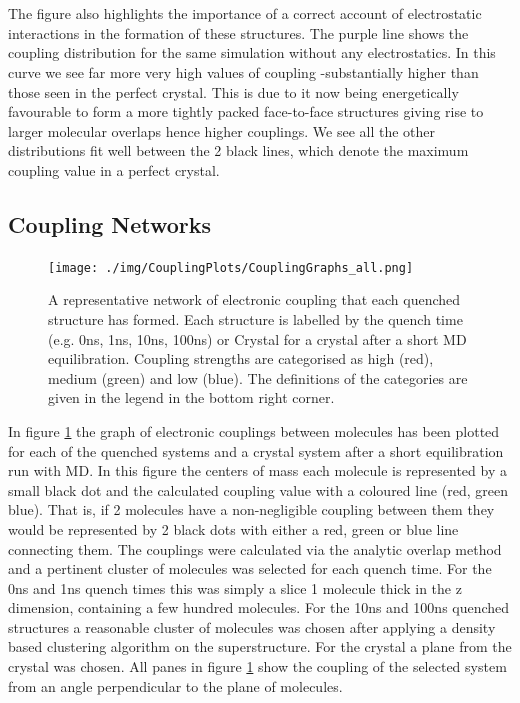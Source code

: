 \\\\
The figure also highlights the importance of a correct account of electrostatic interactions in the formation of these structures. The purple line shows the coupling distribution for the same simulation without any electrostatics. In this curve we see far more very high values of coupling -substantially higher than those seen in the perfect crystal. This is due to it now being energetically favourable to form a more tightly packed face-to-face structures giving rise to larger molecular overlaps hence higher couplings. We see all the other distributions fit well between the 2 black lines, which denote the maximum coupling value in a perfect crystal.
\subsection{Coupling Networks}
\label{sect:couplGraphs}
\begin{figure}[ht]
	\texttt{[image: ./img/CouplingPlots/CouplingGraphs\_all.png]}
	\caption{\label{fig:crystalCouplingGraph}A representative network of electronic coupling that each quenched structure has formed. Each structure is labelled by the quench time (e.g. 0ns, 1ns, 10ns, 100ns) or Crystal for a crystal after a short MD equilibration. Coupling strengths are categorised as high (red), medium (green) and low (blue). The definitions of the categories are given in the legend in the bottom right corner.}
\end{figure}
\noindent In figure \ref{fig:crystalCouplingGraph} the graph of electronic couplings between molecules has been plotted for each of the quenched systems and a crystal system after a short equilibration run with MD. In this figure the centers of mass each molecule is represented by a small black dot and the calculated coupling value with a coloured line (red, green blue). That is, if 2 molecules have a non-negligible coupling between them they would be represented by 2 black dots with either a red, green or blue line connecting them. The couplings were calculated via the analytic overlap method \cite{gajdos_ultrafast_2014} and a pertinent cluster of molecules was selected for each quench time. For the 0ns and 1ns quench times this was simply a slice 1 molecule thick in the z dimension, containing a few hundred molecules. For the 10ns and 100ns quenched structures a reasonable cluster of molecules was chosen after applying a density based clustering algorithm on the superstructure. For the crystal a plane from the crystal was chosen. All panes in figure \ref{fig:crystalCouplingGraph} show the coupling of the selected system from an angle perpendicular to the plane of molecules.
